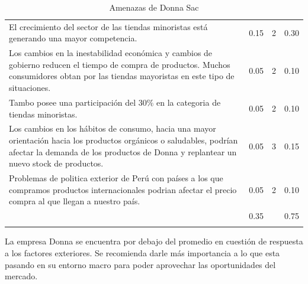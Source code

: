 \begin{longtable}{L{5cm} | C{2.5cm} | C{2.5cm} | C{2.5cm} }
	\hline
	 &   &  & \\
	\hline
	\endhead
	El crecimiento del sector de las tiendas minoristas está generando una mayor competencia. & 0.15 & 2 &0.30\\
	\hline
	Los cambios en la inestabilidad económica y cambios de gobierno reducen el tiempo de compra de productos. Muchos consumidores obtan por las tiendas mayoristas en este tipo de situaciones. & 0.05 & 2 & 0.10\\
	\hline
	Tambo posee una participación del 30\% en la categoria de tiendas minoristas. & 0.05 & 2 & 0.10\\
	\hline
	Los cambios en los hábitos de consumo, hacia una mayor orientación hacia los productos orgánicos o saludables, podrían afectar la demanda de los productos de Donna y replantear un nuevo stock de productos. & 0.05 & 3 & 0.15\\
	\hline
	Problemas de politica exterior de Perú con países a los que compramos productos internacionales podrian afectar el precio compra al que llegan a nuestro país. & 0.05 & 2 & 0.10\\
	\hline
	& 0.35 &  & 0.75\\
	\hline
	\caption{Amenazas de Donna Sac}
	\label{tab:widgets}
\end{longtable}

La empresa Donna se encuentra por debajo del promedio en cuestión de respuesta a los factores exteriores. Se recomienda darle más importancia a lo que esta pasando en su entorno macro para poder aprovechar las oportunidades del mercado.

